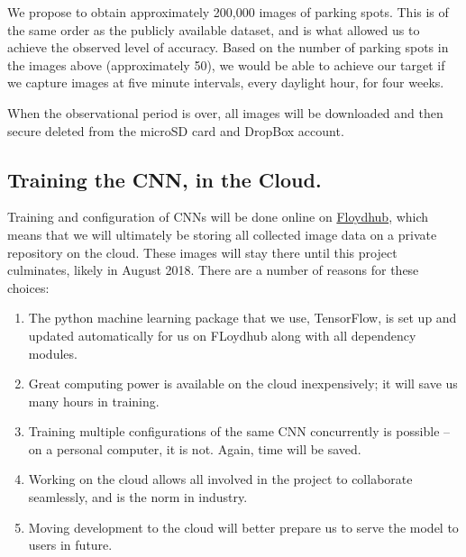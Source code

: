 \documentclass[]{article}
\begin{document}
We propose to obtain approximately 200,000 images of parking spots. This is of
the same order as the publicly available dataset, and is what allowed us to
achieve the observed level of accuracy. Based on the number of parking spots
in the images above (approximately 50), we would be able to achieve our target
if we capture images at five minute intervals, every daylight hour, for four
weeks. 

%
When the observational period is over, all images will be downloaded and
then secure deleted from the microSD card and DropBox account. 
%
%
%
\subsection{Training the CNN, in the Cloud.}\label{training-the-cnn-on-the-cloud.}

Training and configuration of CNNs will be done online on
\href{https://www.floydhub.com}{Floydhub}, which means that we will ultimately
be storing all collected image data on a private repository on the cloud. These
images will stay there until this project culminates, likely in August 2018.
There are a number of reasons for these choices:

\begin{enumerate}
  \item The python machine learning package that we use, TensorFlow, is set up
and updated automatically for us on FLoydhub along with all dependency modules.
  \item Great computing power is available on the cloud inexpensively; it will
  save us many hours in training.
  \item Training multiple configurations of the same CNN concurrently is
  possible -- on a personal computer, it is not. Again, time will be saved.
  \item Working on the cloud allows all involved in the project to collaborate
  seamlessly, and is the norm in industry.
  \item Moving development to the cloud will better prepare us to serve the
model to users in future.
\end{enumerate}
\end{document}
